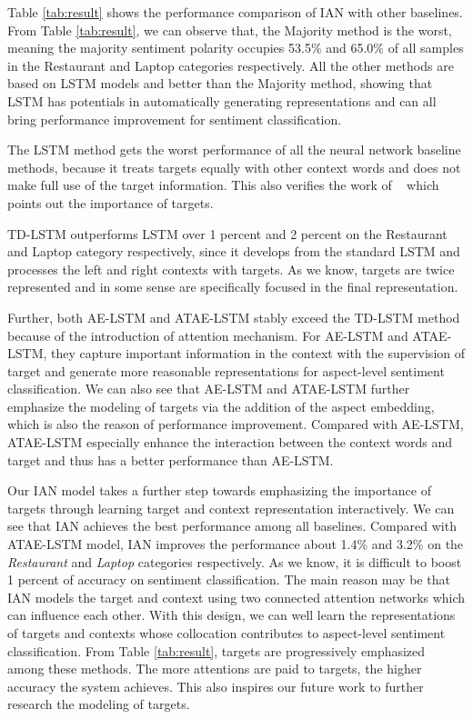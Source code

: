 \documentclass{article}
\begin{document}
Table \ref{tab:result} shows the performance comparison of IAN with other baselines. 
From Table \ref{tab:result}, we can observe that, 
the Majority method is the worst, meaning the majority sentiment polarity occupies 53.5\% and 65.0\% of all samples in the Restaurant and Laptop categories respectively. All the other methods are  based on LSTM models and better than the Majority method, showing that LSTM has potentials in  automatically generating representations and can all bring performance improvement for sentiment classification.

The LSTM method gets the worst performance of all the neural network baseline methods, because it treats targets equally with other context words and does not make full use of the target information. This also verifies the work of ~\cite{jiang2011target} which points out the importance of targets.

TD-LSTM outperforms LSTM over 1 percent and 2 percent on the Restaurant and Laptop category respectively, since it develops from the standard LSTM and  processes the left and right contexts with targets. As we know, targets are twice represented and in some sense are specifically focused in the final representation.

Further, both AE-LSTM and ATAE-LSTM stably exceed the TD-LSTM method because of the introduction of attention mechanism.
For AE-LSTM and ATAE-LSTM, they capture important information in the context with the supervision of target and generate more reasonable representations for aspect-level sentiment classification.
We can also see that AE-LSTM and ATAE-LSTM further emphasize the modeling of targets via the addition of the aspect embedding, which is also the reason of performance improvement.
Compared with AE-LSTM, ATAE-LSTM especially enhance the interaction between the context words and target and thus has a better performance than AE-LSTM.

Our IAN model takes a further step towards emphasizing the importance of targets through learning target and context representation interactively.
We can see that IAN  achieves the best performance among all baselines. Compared with ATAE-LSTM model, IAN improves the performance about 1.4\% and 3.2\% on the \emph{Restaurant} and \emph{Laptop} categories respectively. 
As we know, it is difficult to boost 1 percent of accuracy on sentiment classification.
The main reason may be that IAN models the target and context using two connected attention networks which can influence each other.
With this design, we can well learn the representations of targets and contexts whose collocation contributes to aspect-level sentiment classification.
From Table  \ref{tab:result}, targets are progressively emphasized among these methods. The more attentions are paid to targets, the higher accuracy the system achieves.
This also inspires our future work to further research the modeling of targets.
\end{document}
